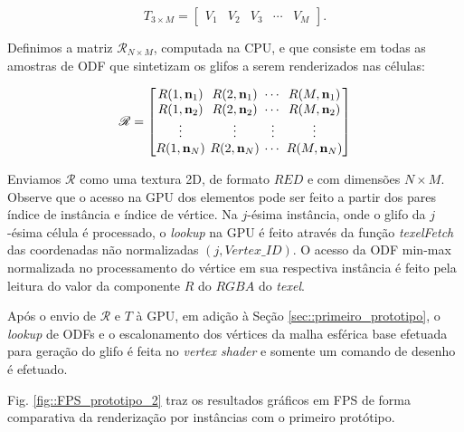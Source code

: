 \documentclass[
    12pt,                %
    oneside,            %
    a4paper,            %
    english,            %
    french,                %
    spanish,            %
    brazil                %
    ]{abntex2}
\begin{document}
\begin{equation}
\label{eq::vertices_prototipo2}
    T_{3\times M} = 
    \begin{bmatrix}
    V_1 & V_2 & V_3 & \cdots & V_M
    \end{bmatrix}
    .
\end{equation}

Definimos a matriz $\boldsymbol{\mathscr{R}}_{N \times M}$, computada na CPU, e que consiste em todas as amostras de ODF que sintetizam os glifos a serem renderizados nas células:%

\begin{equation}
\label{eq::odf_prototipo2}
\boldsymbol{\mathscr{R}} = 
\begingroup %
\setlength\arraycolsep{2pt}
\begin{bmatrix} 
    R(1, \mathbf{n}_1) &
    R(2, \mathbf{n}_1) & \cdots & 
    R(M, \mathbf{n}_1)  \\
    
    R(1, \mathbf{n}_2) &
    R(2, \mathbf{n}_2) & \cdots & 
    R(M, \mathbf{n}_2) \\ \vdots & \vdots & \vdots & \vdots  \\
    
    R(1, \mathbf{n}_N) & 
    R(2, \mathbf{n}_N) & \cdots & 
    R(M, \mathbf{n}_N)
\end{bmatrix}
\endgroup
\end{equation}

Enviamos $\boldsymbol{\mathscr{R}}$ como uma textura 2D, de formato $RED$ e com dimensões $N\times M$. Observe que o acesso na GPU dos elementos pode ser feito a partir dos pares índice de instância e índice de vértice. Na $j$-ésima instância, onde o glifo da $j$-ésima célula é processado, o \textit{lookup} na GPU é feito através da função \textit{texelFetch} das coordenadas não normalizadas $(j, Vertex\_ID)$. O acesso da ODF min-max normalizada no processamento do vértice em sua respectiva instância é feito pela leitura do valor da componente $R$ do $RGBA$ do \textit{texel}.

Após o envio de $\boldsymbol{\mathscr{R}}$ e $T$ à GPU, em adição à Seção \ref{sec::primeiro_prototipo}, o \textit{lookup} de ODFs e o escalonamento dos vértices da malha esférica base efetuada para geração do glifo é feita no \textit{vertex shader} e somente um comando de desenho é efetuado.

Fig. \ref{fig::FPS_prototipo_2} traz os resultados gráficos em FPS de forma comparativa da renderização por instâncias com o primeiro protótipo.
\end{document}
